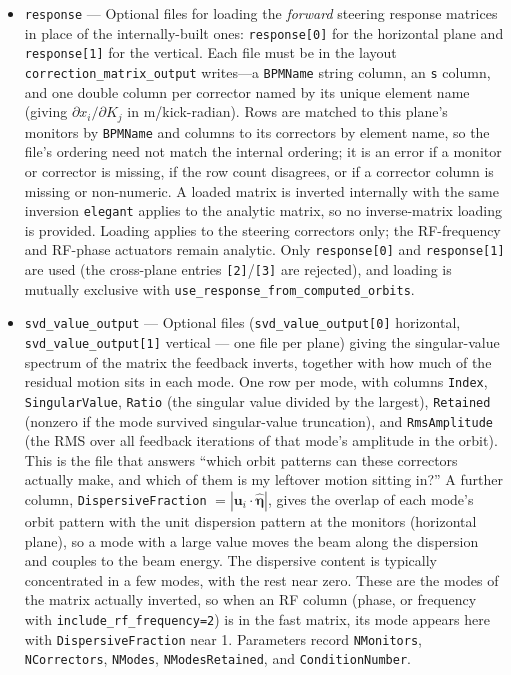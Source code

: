 \documentclass[11pt]{article}
\begin{document}
\begin{itemize}
\item \verb|response| --- Optional files for loading the \emph{forward} steering response
  matrices in place of the internally-built ones: \verb|response[0]| for the horizontal plane
  and \verb|response[1]| for the vertical.  Each file must be in the layout
  \verb|correction_matrix_output| writes---a \verb|BPMName| string column, an \verb|s| column,
  and one double column per corrector named by its unique element name (giving
  $\partial x_i/\partial K_j$ in m/kick-radian).  Rows are matched to this plane's monitors by
  \verb|BPMName| and columns to its correctors by element name, so the file's ordering need not
  match the internal ordering; it is an error if a monitor or corrector is missing, if the row
  count disagrees, or if a corrector column is missing or non-numeric.  A loaded matrix is
  inverted internally with the same inversion \verb|elegant| applies to the analytic matrix, so
  no inverse-matrix loading is provided.  Loading applies to the steering correctors only; the
  RF-frequency and RF-phase actuators remain analytic.  Only \verb|response[0]| and
  \verb|response[1]| are used (the cross-plane entries \verb|[2]|/\verb|[3]| are rejected), and
  loading is mutually exclusive with \verb|use_response_from_computed_orbits|.
\item \verb|svd_value_output| --- Optional files (\verb|svd_value_output[0]| horizontal,
  \verb|svd_value_output[1]| vertical --- one file per plane) giving the singular-value spectrum of
  the matrix the feedback inverts, together with how much of the residual motion sits in each mode.
  One row per mode, with columns \verb|Index|, \verb|SingularValue|, \verb|Ratio| (the singular value
  divided by the largest), \verb|Retained| (nonzero if the mode survived singular-value truncation),
  and \verb|RmsAmplitude| (the RMS over all feedback iterations of that mode's amplitude in the
  orbit).  This is the file that answers ``which orbit patterns can these correctors actually make,
  and which of them is my leftover motion sitting in?''  A further column, \verb|DispersiveFraction|
  $=|\mathbf{u}_i\cdot\hat{\mathbf{\eta}}|$, gives the overlap of each mode's orbit pattern with the
  unit dispersion pattern at the monitors (horizontal plane), so a mode with a large value moves the
  beam along the dispersion and couples to the beam energy.  The dispersive content is typically
  concentrated in a few modes, with the rest near zero.  These are the modes of the matrix actually
  inverted, so when an RF column (phase, or frequency with \verb|include_rf_frequency=2|) is in the
  fast matrix, its mode appears here with \verb|DispersiveFraction| near 1.  Parameters record
  \verb|NMonitors|, \verb|NCorrectors|, \verb|NModes|, \verb|NModesRetained|, and
  \verb|ConditionNumber|.


\end{itemize}
\end{document}
